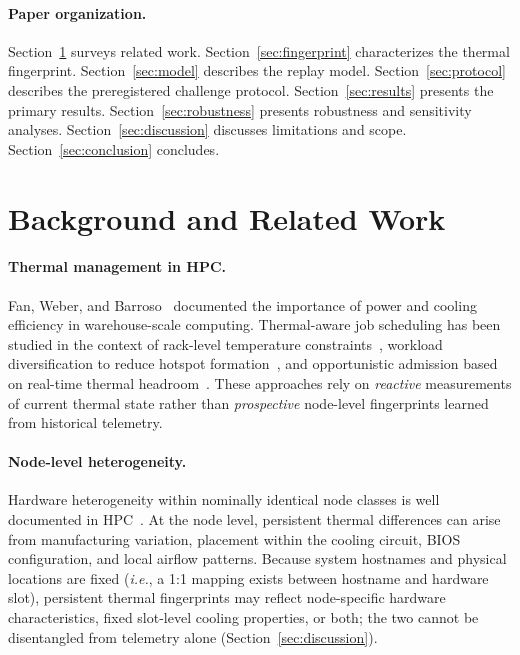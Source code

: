 \documentclass[acmsmall,screen,review,anonymous]{acmart}
\newcommand{\ie}{\textit{i.e.},\xspace}
\begin{document}
\paragraph{Paper organization.}
Section~\ref{sec:background} surveys related work.
Section~\ref{sec:fingerprint} characterizes the thermal fingerprint.
Section~\ref{sec:model} describes the replay model.
Section~\ref{sec:protocol} describes the preregistered challenge protocol.
Section~\ref{sec:results} presents the primary results.
Section~\ref{sec:robustness} presents robustness and sensitivity analyses.
Section~\ref{sec:discussion} discusses limitations and scope.
Section~\ref{sec:conclusion} concludes.

\section{Background and Related Work}
\label{sec:background}

\paragraph{Thermal management in HPC.}
Fan, Weber, and Barroso~\cite{fan2007power} documented the importance of power and
cooling efficiency in warehouse-scale computing.  Thermal-aware job scheduling has been
studied in the context of rack-level temperature constraints~\cite{inadomi2015hpc},
workload diversification to reduce hotspot formation~\cite{ostrouchov2020machine}, and
opportunistic admission based on real-time thermal headroom~\cite{sinha2023thermal}.
These approaches rely on \emph{reactive} measurements of current thermal state rather than
\emph{prospective} node-level fingerprints learned from historical telemetry.

\paragraph{Node-level heterogeneity.}
Hardware heterogeneity within nominally identical node classes is well documented in
HPC~\cite{ostrouchov2020machine}.  At the node level, persistent thermal differences can
arise from manufacturing variation, placement within the cooling circuit, BIOS
configuration, and local airflow patterns.  Because system hostnames and physical
locations are fixed (\ie a 1:1 mapping exists between hostname and hardware slot),
persistent thermal fingerprints may reflect node-specific hardware characteristics,
fixed slot-level cooling properties, or both; the two cannot be disentangled from
telemetry alone (Section~\ref{sec:discussion}).
\end{document}
